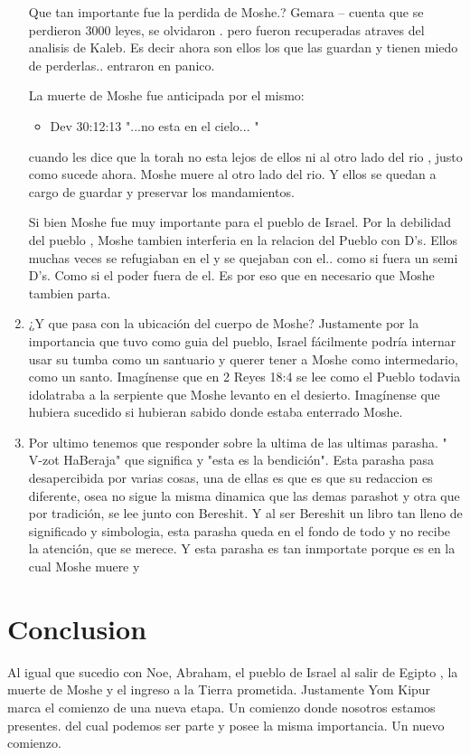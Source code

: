 \documentclass[conference]{IEEEtran}
\begin{document}
\begin{enumerate}
Que tan importante fue la perdida de Moshe.?
Gemara -- cuenta que se perdieron 3000 leyes, se olvidaron . pero fueron recuperadas atraves del analisis de Kaleb.
Es decir ahora son ellos los que las guardan  y tienen miedo de perderlas.. entraron en panico.


La muerte de Moshe fue anticipada por el mismo:

\begin{itemize}
\item
Dev 30:12:13   "...no esta en el cielo... "
\end{itemize}

cuando les dice que la torah no esta lejos de ellos ni al otro lado del rio , justo como sucede ahora. Moshe muere al otro lado del rio. Y ellos se quedan a cargo de guardar y preservar los mandamientos.

Si bien Moshe fue muy importante para el pueblo de Israel. Por la debilidad del pueblo ,
Moshe tambien interferia en la relacion del Pueblo con D's. Ellos muchas veces se refugiaban en el y se quejaban con el..
como si fuera un semi D's. Como si el poder fuera de el. Es por eso que en necesario que Moshe tambien parta.

\item ¿Y que pasa con la ubicación del cuerpo de Moshe? Justamente por la importancia que tuvo como guia del pueblo, Israel fácilmente podría internar usar su tumba como un santuario y querer tener a Moshe como intermedario, como un santo. 
Imagínense que en 2 Reyes 18:4 se lee como el Pueblo todavia idolatraba a la serpiente que Moshe levanto en el desierto. Imagínense que hubiera sucedido si hubieran sabido donde estaba enterrado Moshe.

\item 
Por ultimo tenemos que responder sobre la ultima de las ultimas parasha. " V-zot HaBeraja" que significa y "esta es la bendición". Esta parasha pasa desapercibida por varias cosas, una de ellas es que es que su redaccion es diferente, osea no sigue la misma dinamica que las demas parashot y otra que por tradición, se lee junto con Bereshit. Y al ser Bereshit un libro tan lleno de significado y simbologia, esta parasha queda en el  fondo de todo y no recibe la atención, que se merece. 
Y esta parasha es tan inmportate porque es en la cual Moshe muere y 

\end{enumerate}

\section{Conclusion}
Al igual que sucedio con Noe, Abraham, el pueblo de Israel al salir de Egipto , la muerte de Moshe y el ingreso a la Tierra prometida. Justamente Yom Kipur marca el comienzo de una nueva etapa. Un comienzo donde nosotros estamos presentes. del cual podemos ser parte y posee la misma importancia. Un nuevo comienzo.








\end{document}
